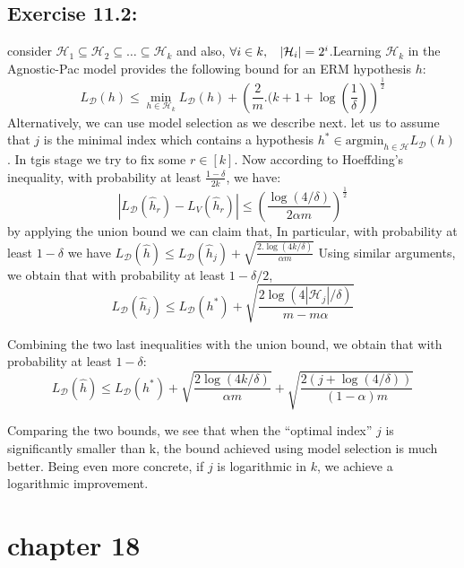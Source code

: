 \documentclass[]{book}
\begin{document}
\subsection*{Exercise 11.2:}
consider $\mathcal{H}_1 \subseteq \mathcal{H}_2 \subseteq \hdots \subseteq \mathcal{H}_k$ and also, $\forall i \in k, \hspace{0.3cm} |\mathcal{H}_i|=2^i$.Learning $\mathcal{H}_k$ in the Agnostic-Pac model provides the following bound for an ERM hypothesis $h$:
\begin{equation*}
    L_{\mathcal{D}}(h)\leq \min_{h\in \mathcal{H}_k}L_{\mathcal{D}}(h)+\left ( \frac{2}{m}.(k+1+\log(\frac{1}{\delta}) \right )^{\frac{1}{2}}
\end{equation*}
Alternatively, we can use model selection as we describe next. let us to assume that $j$ is the minimal index which contains a hypothesis $h^* \in \text{argmin}_{h\in \mathcal{H}}L_{\mathcal{D}}(h)$. In tgis stage we try to fix some $r \in [k]$. Now according to Hoeffding’s inequality, with probability at least $\frac{1-\delta}{2k}$, we have:
\begin{equation*}
    |L_\mathcal{D}(\hat{h}_r)-L_V(\hat{h}_r)|\leq \left ( \frac{\log (4/ {\delta})}{2\alpha m} \right )^{\frac{1}{2}}
\end{equation*}
by applying the union bound we can claim that, In particular, with probability at least  $1-\delta$ we have $L_\mathcal{D}(\hat{h})\leq L_\mathcal{D}(\hat{h}_j)+\sqrt{\frac{2.\log(4k/\delta)}{\alpha m}}$
Using similar arguments, we obtain that with probability at least
$1-\delta/2$,
\begin{equation*}
    L_\mathcal{D}(\hat{h}_j)\leq L_\mathcal{D}(h^*)+\sqrt{\frac{2\log (4|\mathcal{H}_j|/\delta)}{m-m\alpha}}
\end{equation*}

Combining the two last inequalities with the union bound, we obtain
that with probability at least $1-\delta$:
\begin{equation*}
    L_\mathcal{D}(\hat{h})\leq L_\mathcal{D}(h^*)+\sqrt{\frac{2\log(4k/\delta)}{\alpha m}}+\sqrt{\frac{2(j+\log(4/\delta))}{(1-\alpha)m}}
\end{equation*}

Comparing the two bounds, we see that when the “optimal index” $j$ is significantly smaller than k, the bound achieved using model selection is much better. Being even more concrete, if $j$ is logarithmic in $k$, we achieve a logarithmic improvement.

\section*{chapter 18}
\end{document}
